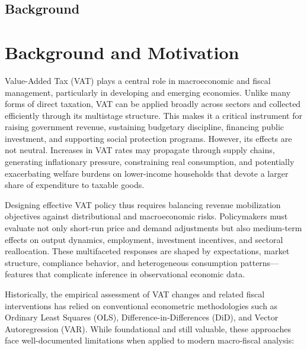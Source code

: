 \subsection{Background}
\section{Background and Motivation}\label{sec:background}

Value-Added Tax (VAT) plays a central role in macroeconomic and fiscal management, particularly in developing and emerging economies. Unlike many forms of direct taxation, VAT can be applied broadly across sectors and collected efficiently through its multistage structure. This makes it a critical instrument for raising government revenue, sustaining budgetary discipline, financing public investment, and supporting social protection programs. However, its effects are not neutral. Increases in VAT rates may propagate through supply chains, generating inflationary pressure, constraining real consumption, and potentially exacerbating welfare burdens on lower-income households that devote a larger share of expenditure to taxable goods.

Designing effective VAT policy thus requires balancing revenue mobilization objectives against distributional and macroeconomic risks. Policymakers must evaluate not only short-run price and demand adjustments but also medium-term effects on output dynamics, employment, investment incentives, and sectoral reallocation. These multifaceted responses are shaped by expectations, market structure, compliance behavior, and heterogeneous consumption patterns—features that complicate inference in observational economic data.

Historically, the empirical assessment of VAT changes and related fiscal interventions has relied on conventional econometric methodologies such as Ordinary Least Squares (OLS), Difference-in-Differences (DiD), and Vector Autoregression (VAR). While foundational and still valuable, these approaches face well-documented limitations when applied to modern macro‑fiscal analysis:

